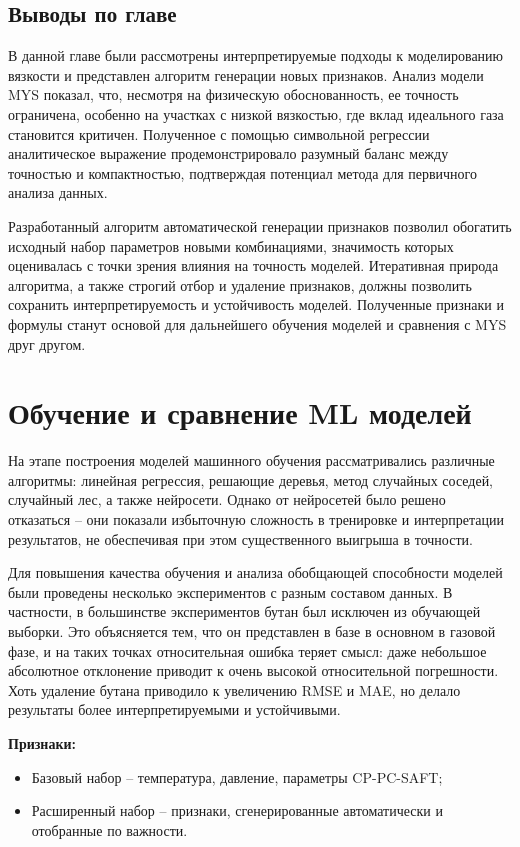 \documentclass[a4paper,12pt]{article}
\begin{document}
  \subsection{Выводы по главе}

    В данной главе были рассмотрены интерпретируемые подходы к моделированию вязкости и представлен алгоритм генерации новых признаков. Анализ модели MYS показал, что, несмотря на физическую обоснованность, ее точность ограничена, особенно на участках с низкой вязкостью, где вклад идеального газа становится критичен. Полученное с помощью символьной регрессии аналитическое выражение продемонстрировало разумный баланс между точностью и компактностью, подтверждая потенциал метода для первичного анализа данных.
    
    Разработанный алгоритм автоматической генерации признаков позволил обогатить исходный набор параметров новыми комбинациями, значимость которых оценивалась с точки зрения влияния на точность моделей. Итеративная природа алгоритма, а также строгий отбор и удаление признаков, должны позволить сохранить интерпретируемость и устойчивость моделей. Полученные признаки и формулы станут основой для дальнейшего обучения моделей и сравнения с MYS друг другом.
\newpage

\section{Обучение и сравнение ML моделей}

  На этапе построения моделей машинного обучения рассматривались различные алгоритмы: линейная регрессия, решающие деревья, метод случайных соседей, случайный лес, а также нейросети. Однако от нейросетей было решено отказаться -- они показали избыточную сложность в тренировке и интерпретации результатов, не обеспечивая при этом существенного выигрыша в точности.
  
  Для повышения качества обучения и анализа обобщающей способности моделей были проведены несколько экспериментов с разным составом данных. В частности, в большинстве экспериментов бутан был исключен из обучающей выборки. Это объясняется тем, что он представлен в базе в основном в газовой фазе, и на таких точках относительная ошибка теряет смысл: даже небольшое абсолютное отклонение приводит к очень высокой относительной погрешности. Хоть удаление бутана приводило к увеличению RMSE и MAE, но делало результаты более интерпретируемыми и устойчивыми.
  
  \begin{minipage}{\textwidth}
    \textbf{Признаки:}
    \begin{itemize}
      \item Базовый набор -- температура, давление, параметры CP-PC-SAFT;
      \item Расширенный набор -- признаки, сгенерированные автоматически и отобранные по важности.
    \end{itemize}
  \end{minipage}
  
\end{document}
